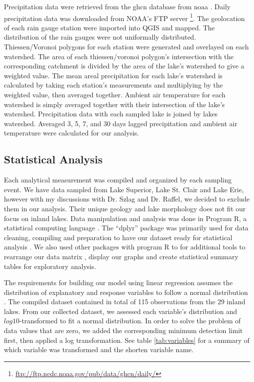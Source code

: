 Precipitation data were retrieved from the \gls{ghcn} database from \gls{noaa} \cite{menne_global_2012}. Daily precipitation data was downloaded from NOAA's FTP server \footnote{\url{ftp://ftp.ncdc.noaa.gov/pub/data/ghcn/daily/}}.  The geolocation of each rain gauge station were imported into QGIS and mapped. The distribution of the rain gauges were not uniformally distributed. Thiessen/Voronoi polygons for each station were generated and overlayed on each watershed. The area of each thiessen/voronoi polygon's intersection with the corresponding catchment is divided by the area of the lake's watershed to give a weighted value. The mean areal precipitation for each lake's watershed is calculated by taking each station's measurements and multiplying by the weighted value, then averaged together.  Ambient air temperature for each watershed is simply averaged together with their intersection of the lake's watershed. Precipitation data with each sampled lake is joined by lakes watershed. Averaged 3, 5, 7, and 30 days lagged precipitation and ambient air temperature were calculated for our analysis.

\subsection{Statistical Analysis}

Each analytical measurement was compiled and organized by each sampling event. We have data sampled from Lake Superior, Lake St. Clair and Lake Erie, however with my discussions with Dr. Szlag and Dr. Raffel, we decided to exclude them in our analysis.  Their unique geology and lake morphology does not fit our focus on inland lakes.
Data manipulation and analysis was done in Program R, a statistical computing language \cite{r_core_team_r:_2018}. The ``dplyr'' package was primarily used for data cleaning, compiling and preparation to have our dataset ready for statistical analysis \cite{wickham_dplyr:_2017}. We also used other packages with program R to for additional tools to rearrange our data matrix \cite{robinson_broom:_2018}, display our graphs\cite{wickham_ggplot2:_2009,schloerke_ggally:_2017, garnier_viridis:_2018, wei_r_2017} and create statistical summary tables \cite{leifeld_texreg:_2013,  wickham_tidyverse:_2017, zhu_kableextra:_2018, hlavac_stargazer:_2018, robinson_broom:_2018} for exploratory analysis.

The requirements for building our model using linear regression assumes the distribution of explanatory and response variables to follow a normal distribution \cite{bates_fitting_2015}. The compiled dataset contained in total of 115 observations from the 29 inland lakes.
From our collected dataset, we assessed each variable's distribution and $log10$-transformed to fit a normal distribution. In order to solve the problem of data values that are zero, we added the corresponding minimum detection limit first, then applied a log transformation. See table \ref{tab:variables} for a summary of which variable was transformed and the shorten variable name.

